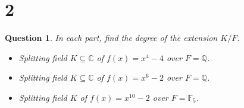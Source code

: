 \documentclass{article}
\newtheorem{question}{Question}
\begin{document}
\break

\section*{2}
\begin{myBox}[]{}
    \begin{question}
        In each part, find the degree of the extension $K/F$.
        \begin{itemize}
            \item[(a)] Splitting field $K\subseteq\mathbb{C}$ of $f(x)=x^4-4$ over $F=\mathbb{Q}$.
            \item[(b)] Splitting field $K\subseteq\mathbb{C}$ of $f(x)=x^6-2$ over $F=\mathbb{Q}$.
            \item[(c)] Splitting field $K$ of $f(x)=x^{10}-2$ over $F=\mathbb{F}_5$.  
        \end{itemize}
    \end{question}
\end{myBox}
\end{document}
